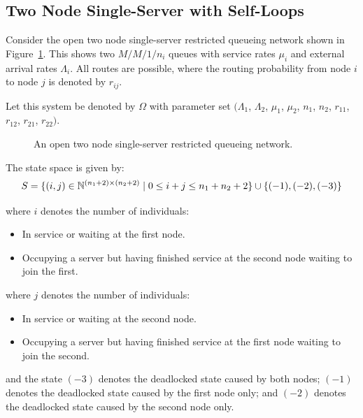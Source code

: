 \documentclass{article}
\numberwithin{equation}{section}
\begin{document}
\subsection{Two Node Single-Server with Self-Loops}\label{sec:2nodeselfloops}

Consider the open two node single-server restricted queueing network shown in Figure~\ref{fig:queueingnetwork_2nodesfeedback}.
This shows two \(M/M/1/n_i\) queues with service rates $\mu_i$  and external arrival rates $\Lambda_i$.
All routes are possible, where the routing probability from node $i$ to node $j$ is denoted by $r_{ij}$.

Let this system be denoted by $\Omega$ with parameter set $(\Lambda_1$, $\Lambda_2$, $\mu_1$, $\mu_2$, $n_1$, $n_2$, $r_{11}$, $r_{12}$, $r_{21}$, $r_{22})$.

\begin{figure}[!htbp]
  \begin{center}
  
  \end{center}
  \caption{An open two node single-server restricted queueing network.}
  \label{fig:queueingnetwork_2nodesfeedback}
\end{figure}

The state space is given by:
    \[S = \{(i,j)\in\mathbb{N}^{(n_1+2)\times (n_2+2)} \nonscript\; | \nonscript\; 0 \leq i + j \leq n_1 + n_2 + 2
    \}\cup\{(-1), (-2), (-3)\}\]

    where \(i\) denotes the number of individuals:
        \begin{itemize}
            \item In service or waiting at the first node.
            \item Occupying a server but having finished service at the
                second node waiting to join the first.
        \end{itemize}
    where \(j\) denotes the number of individuals:
        \begin{itemize}
            \item In service or waiting at the second node.
            \item Occupying a server but having finished service at the
                first node waiting to join the second.
        \end{itemize}
    and the state $(-3)$ denotes the deadlocked state caused by both nodes; $(-1)$ denotes the deadlocked state caused by the first node only; and $(-2)$ denotes the deadlocked state caused by the second node only.
\end{document}
